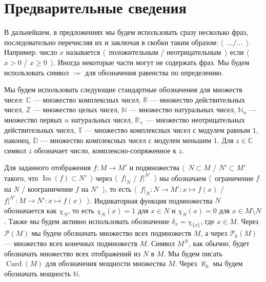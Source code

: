 \chapter{Предварительные сведения}\label{ChapterPreliminaries} 

В дальнейшем, в предложениях мы будем использовать сразу несколько фраз,
последовательно перечисляя их и заключая в скобки таким образом:
$\langle$~$\ldots$/$\ldots$~$\rangle$. Например: число $x$ называется
$\langle$~положительным / неотрицательным~$\rangle$ если $\langle$~$x>0$ /
$x\geq 0$~$\rangle$. Иногда некоторые части могут не  содержать фраз. Мы будем
использовать символ $:=$ для обозначения равенства по определению.

Мы будем использовать следующие стандартные обозначения для множеств чисел:
$\mathbb{C}$ --- множество комплексных чисел, $\mathbb{R}$ --- множество
действительных чисел, $\mathbb{Z}$ --- множество целых чисел, $\mathbb{N}$ ---
множество натуральных чисел, $\mathbb{N}_n$ --- множество первых $n$ натуральных
чисел, $\mathbb{R}_+$ --- множество неотрицательных действительных чисел,
$\mathbb{T}$ --- множество комплексных чисел с модулем равным $1$, наконец,
$\mathbb{D}$ --- множество комплексных чисел с модулем меньшим $1$. Для
$z\in\mathbb{C}$ символ $\overline{z}$ обозначает число, комплексно-сопряженное
к $z$.

Для заданного отображения $f:M\to M'$ и подмножества $\langle$~$N\subset M$ /
$N'\subset M'$ такого, что $\operatorname{Im}(f)\subset N'$~$\rangle$ через
$\langle$~$f|_N$ / $f|^{N'}$~$\rangle$ мы обозначаем $\langle$~ограничение $f$
на $N$ / коограничение $f$ на $N'$~$\rangle$, то есть $\langle$~$f|_N:N\to
M':x\mapsto f(x)$ / $f|^{N'}:M\to N':x\mapsto f(x)$~$\rangle$. Индикаторная
функция подмножества $N$ обозначается как $\chi_{N}$, то есть $\chi_N(x)=1$ для
$x\in N$ и $\chi_N(x)=0$ для $x\in M\setminus N$. Также мы будем активно
использовать обозначение $\delta_x=\chi_{\{x\}}$, где $x\in M$. Через
$\mathcal{P}(M)$ мы будем обозначать множество всех подмножеств $M$, а через
$\mathcal{P}_0(M)$ --- множество всех конечных подмножеств $M$. Символ $M^N$,
как обычно, будет обозначать множество всех отображений из $N$ в $M$. Мы будем
писать $\operatorname{Card}(M)$ для обозначения мощности множества $M$. Через
$\aleph_0$ мы будем обозначать мощность $\mathbb{N}$.




